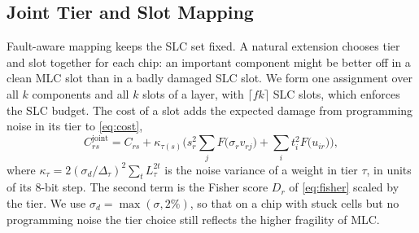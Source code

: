 \subsection{Joint Tier and Slot Mapping}
Fault-aware mapping keeps the SLC set fixed. A natural extension chooses tier and slot together for each
chip: an important component might be better off in a clean MLC slot than in a badly damaged SLC slot. We
form one assignment over all $k$ components and all $k$ slots of a layer, with $\lceil fk\rceil$ SLC slots,
which enforces the SLC budget. The cost of a slot adds the expected damage from programming noise in its
tier to \cref{eq:cost},
\begin{equation}
C^{\text{joint}}_{rs}=C_{rs}+\kappa_{\tau(s)}\Big(s_r^2\sum_j F\big(\sigma_r v_{rj}\big)+\sum_i t_i^2F\big(u_{ir}\big)\Big),
\label{eq:c1}
\end{equation}
where $\kappa_\tau=2(\sigma_d/\Delta_\tau)^2\sum_t L_\tau^{2t}$ is the noise variance of a weight in tier
$\tau$, in units of its 8-bit step. The second term is the Fisher score $D_r$ of \cref{eq:fisher} scaled
by the tier. We use $\sigma_d=\max(\sigma,2\%)$, so that on a chip with stuck cells but no programming noise
the tier choice still reflects the higher fragility of MLC.
